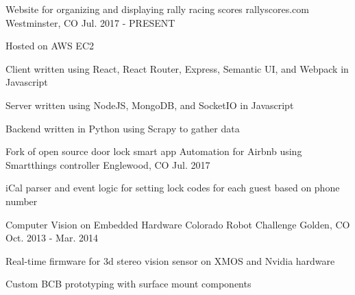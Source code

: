 

\begin{cventries}

  \cventry
    {Website for organizing and displaying rally racing scores} %
    {rallyscores.com} %
    {Westminster, CO} %
    {Jul. 2017 - PRESENT} %
    {
      \begin{cvitems} %
        \item {Hosted on AWS EC2}
        \item {Client written using React, React Router, Express, Semantic UI, and Webpack in Javascript}
        \item {Server written using NodeJS, MongoDB, and SocketIO in Javascript}
        \item {Backend written in Python using Scrapy to gather data}
      \end{cvitems}
    }
    
  \cventry
    {Fork of open source door lock smart app}
    {Automation for Airbnb using Smartthings controller}
    {Englewood, CO} %
    {Jul. 2017} %
    {
      \begin{cvitems} %
        \item {iCal parser and event logic for setting lock codes for each guest based on phone number}
      \end{cvitems}
    }

  \cventry
    {Computer Vision on Embedded Hardware} %
    {Colorado Robot Challenge} %
    {Golden, CO} %
    {Oct. 2013 - Mar. 2014} %
    {
      \begin{cvitems} %
        \item {Real-time firmware for 3d stereo vision sensor on XMOS and Nvidia hardware}
        \item {Custom BCB prototyping with surface mount components}
      \end{cvitems}
    }

\end{cventries}

